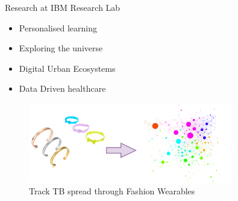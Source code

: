 \documentclass{beamer}
\begin{document}
\begin{frame}{ Research at IBM Research Lab}
	\begin{itemize}
	\item Personalised learning
	\item Exploring the universe
	\item Digital Urban Ecosystems
	\item[\textcolor{red}{\textbullet}] Data Driven healthcare	
	\end{itemize}
	\begin{figure}
	\includegraphics[width=0.8\textwidth]{tb.png}
	\caption{Track TB spread through Fashion Wearables}
	\end{figure}

\end{frame}
\end{document}
